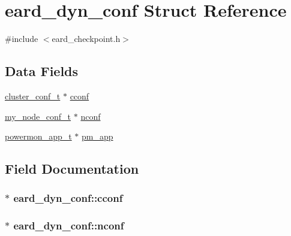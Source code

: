 \hypertarget{structeard__dyn__conf}{}\section{eard\+\_\+dyn\+\_\+conf Struct Reference}
\label{structeard__dyn__conf}


{\ttfamily \#include $<$eard\+\_\+checkpoint.\+h$>$}

\subsection*{Data Fields}
\begin{DoxyCompactItemize}
\item 
\hyperlink{cluster__conf_8h_ac9321adc9770e987439ad10c4bd1913e}{cluster\+\_\+conf\+\_\+t} $\ast$ \hyperlink{structeard__dyn__conf_a828db33d6233303edea5a0d6402cd514}{cconf}
\item 
\hyperlink{cluster__conf_8h_a3e757dbe9c6eacf7676d955890edc8dc}{my\+\_\+node\+\_\+conf\+\_\+t} $\ast$ \hyperlink{structeard__dyn__conf_ad93864cf7f03c5c2aca4a4e7b1fef159}{nconf}
\item 
\hyperlink{power__monitor_8h_a0c338f8504224469cd258fdb3b08e9e6}{powermon\+\_\+app\+\_\+t} $\ast$ \hyperlink{structeard__dyn__conf_acd3d063b6232ac49e17b6627851f9c5a}{pm\+\_\+app}
\end{DoxyCompactItemize}


\subsection{Field Documentation}
\subsubsection[{\texorpdfstring{cconf}{cconf}}]{$\ast$ eard\+\_\+dyn\+\_\+conf\+::cconf}\hypertarget{structeard__dyn__conf_a828db33d6233303edea5a0d6402cd514}{}\label{structeard__dyn__conf_a828db33d6233303edea5a0d6402cd514}
\subsubsection[{\texorpdfstring{nconf}{nconf}}]{$\ast$ eard\+\_\+dyn\+\_\+conf\+::nconf}\hypertarget{structeard__dyn__conf_ad93864cf7f03c5c2aca4a4e7b1fef159}{}\label{structeard__dyn__conf_ad93864cf7f03c5c2aca4a4e7b1fef159}

